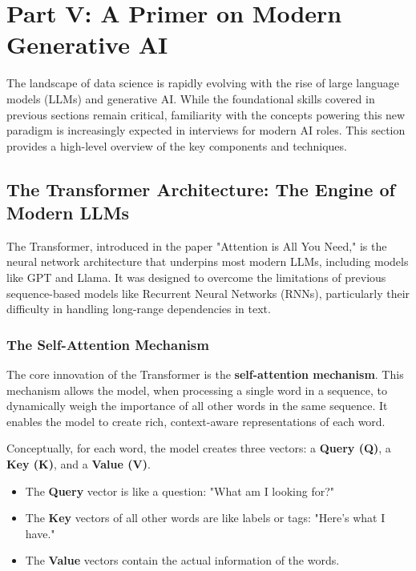 \documentclass[11pt,a4paper]{article}
\begin{document}
\section{Part V: A Primer on Modern Generative AI}

The landscape of data science is rapidly evolving with the rise of large language models (LLMs) and generative AI. While the foundational skills covered in previous sections remain critical, familiarity with the concepts powering this new paradigm is increasingly expected in interviews for modern AI roles. This section provides a high-level overview of the key components and techniques.

\subsection{The Transformer Architecture: The Engine of Modern LLMs}

The Transformer, introduced in the paper "Attention is All You Need," is the neural network architecture that underpins most modern LLMs, including models like GPT and Llama. It was designed to overcome the limitations of previous sequence-based models like Recurrent Neural Networks (RNNs), particularly their difficulty in handling long-range dependencies in text.

\subsubsection{The Self-Attention Mechanism}

The core innovation of the Transformer is the \textbf{self-attention mechanism}. This mechanism allows the model, when processing a single word in a sequence, to dynamically weigh the importance of all other words in the same sequence. It enables the model to create rich, context-aware representations of each word.

Conceptually, for each word, the model creates three vectors: a \textbf{Query (Q)}, a \textbf{Key (K)}, and a \textbf{Value (V)}.
\begin{itemize}
    \item The \textbf{Query} vector is like a question: "What am I looking for?"
    \item The \textbf{Key} vectors of all other words are like labels or tags: "Here's what I have."
    \item The \textbf{Value} vectors contain the actual information of the words.
\end{itemize}
\end{document}
